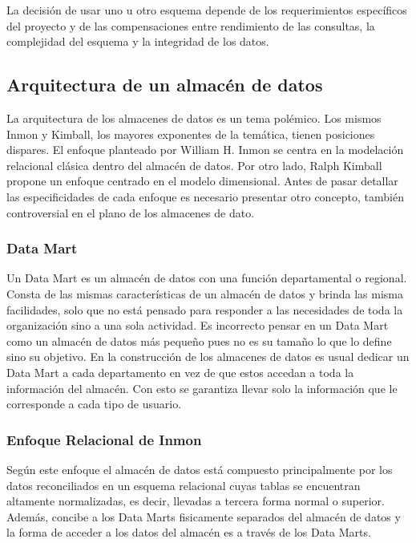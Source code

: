La decisi\'on de usar uno u otro esquema depende de los requerimientos espec\'ificos del proyecto y de las compensaciones entre 
rendimiento de las consultas, la complejidad del esquema y la integridad de los datos.


\subsection{Arquitectura de un almac\'en de datos}

La arquitectura de los almacenes de datos es un tema pol\'emico. Los mismos Inmon y Kimball, los mayores exponentes de la tem\'atica, 
tienen posiciones dispares. El enfoque planteado por William H. Inmon se centra en la modelación relacional cl\'asica dentro 
del almacén de datos. Por otro lado, Ralph Kimball propone un enfoque centrado en el modelo dimensional. Antes de pasar 
detallar las especificidades de cada enfoque es necesario presentar otro concepto, tambi\'en controversial en el plano de 
los almacenes de dato. 

\subsubsection{Data Mart}

Un Data Mart es un almac\'en de datos con una funci\'on departamental o regional. Consta de las mismas caracter\'isticas de un 
almacén de datos y brinda las misma facilidades, solo que no est\'a pensado para responder a las necesidades de toda la organización
sino a una sola actividad. Es incorrecto pensar en un Data Mart como un almac\'en de datos m\'as pequeño pues no es su tamaño 
lo que lo define sino su objetivo\cite{mijailmaster}. En la construcci\'on de los almacenes de datos es usual dedicar un Data Mart 
a cada departamento en vez de que estos accedan a toda la información del almac\'en. Con esto se garantiza llevar solo la información 
que le corresponde a cada tipo de usuario.

\subsubsection{Enfoque Relacional de Inmon}

Seg\'un este enfoque el almacén de datos est\'a compuesto principalmente por los datos reconciliados en un esquema 
relacional cuyas tablas se encuentran altamente normalizadas, es decir, llevadas a tercera forma normal o superior\cite{mijailmaster}. 
Adem\'as, concibe a los Data Marts fisicamente separados del almacén de datos y la forma de acceder a los datos del almacén es a 
través de los Data Marts.

